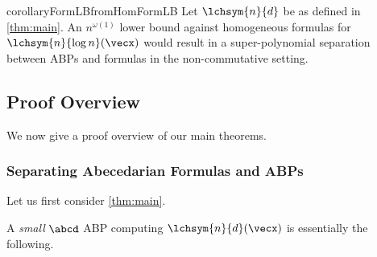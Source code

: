 \begin{restatable}{corollary}{FormLBfromHomFormLB}\label{cor:FormLBfromHomFormLB}
	Let $\lchsym{n}{d}$ be as defined in \autoref{thm:main}. 
	An $n^{\omega(1)}$ lower bound against homogeneous formulas for $\lchsym{n}{\log n}(\vecx)$ would result in a super-polynomial separation between ABPs and formulas in the non-commutative setting. 
\end{restatable}

 \subsection{Proof Overview}\label{sec:proof-overview}

We now give a proof overview of our main theorems.

\subsubsection*{Separating Abecedarian Formulas and ABPs}

Let us first consider \autoref{thm:main}.

\mainThm*

\noindent A \emph{small} $\abcd$ ABP computing $\lchsym{n}{d}(\vecx)$ is essentially the following.

